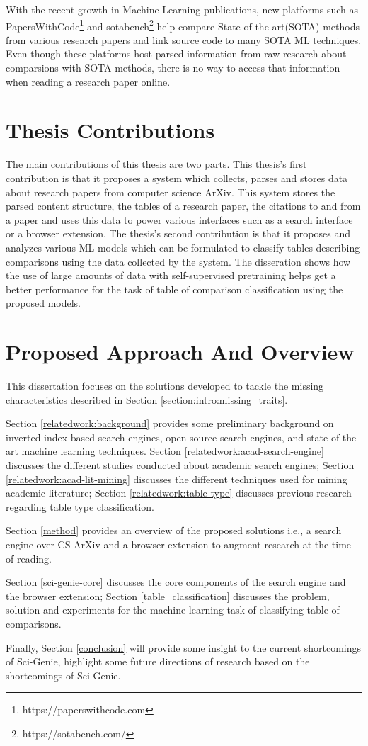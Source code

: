 With the recent growth in Machine Learning publications, new platforms such as PapersWithCode\footnote{https://paperswithcode.com} and sotabench\footnote{https://sotabench.com/} help compare State-of-the-art(SOTA) methods from various research papers and link source code to many SOTA ML techniques. Even though these platforms host parsed information from raw research about comparsions with SOTA methods, there is no way to access that information when reading a research paper online. 

\section{Thesis Contributions}
The main contributions of this thesis are two parts. This thesis's first contribution is that it proposes a system which collects, parses and stores data about research papers from computer science ArXiv. This system stores the parsed content structure, the tables of a research paper, the citations to and from a paper and uses this data to power various interfaces such as a search interface or a browser extension.  The thesis's second contribution is that it proposes and analyzes various ML models which can be formulated to classify tables describing comparisons using the data collected by the system. The disseration shows how the use of large amounts of data with self-supervised pretraining helps get a better performance for the task of table of comparison classification using the proposed models.

\section{Proposed Approach And Overview}
This dissertation focuses on the solutions developed to tackle the missing characteristics described in Section \ref{section:intro:missing_traits}. 

Section \ref{relatedwork:background} provides some preliminary background on inverted-index based search engines, open-source search engines, and state-of-the-art machine learning techniques.
Section \ref{relatedwork:acad-search-engine} discusses the different studies conducted about academic search engines; Section \ref{relatedwork:acad-lit-mining} discusses the different techniques used for mining academic literature; Section \ref{relatedwork:table-type} discusses previous research regarding table type classification. 

Section \ref{method} provides an overview of the proposed solutions i.e., a search engine over CS ArXiv and a browser extension to augment research at the time of reading. 

Section \ref{sci-genie-core} discusses the core components of the search engine and the browser extension; Section \ref{table_classification} discusses the problem, solution and experiments for the machine learning task of classifying table of comparisons.

Finally, Section \ref{conclusion} will provide some insight to the current shortcomings of Sci-Genie, highlight some future directions of research based on the shortcomings of Sci-Genie. 